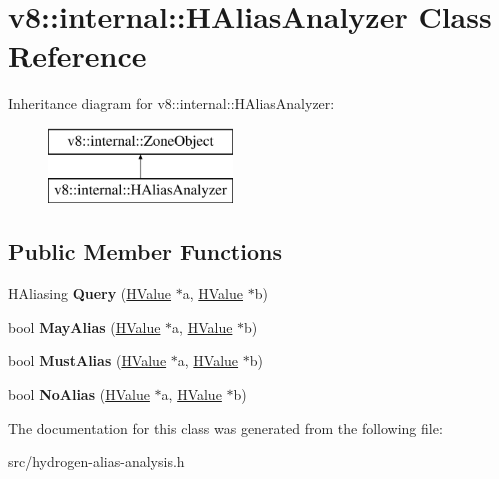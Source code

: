 \hypertarget{classv8_1_1internal_1_1_h_alias_analyzer}{}\section{v8\+:\+:internal\+:\+:H\+Alias\+Analyzer Class Reference}
\label{classv8_1_1internal_1_1_h_alias_analyzer}
Inheritance diagram for v8\+:\+:internal\+:\+:H\+Alias\+Analyzer\+:\begin{figure}[H]
\begin{center}
\leavevmode
\includegraphics[height=2.000000cm]{classv8_1_1internal_1_1_h_alias_analyzer}
\end{center}
\end{figure}
\subsection*{Public Member Functions}
\begin{DoxyCompactItemize}
\item 
\hypertarget{classv8_1_1internal_1_1_h_alias_analyzer_ad2d71024e2af0a08aaddf1a1dffd7bd0}{}H\+Aliasing {\bfseries Query} (\hyperlink{classv8_1_1internal_1_1_h_value}{H\+Value} $\ast$a, \hyperlink{classv8_1_1internal_1_1_h_value}{H\+Value} $\ast$b)\label{classv8_1_1internal_1_1_h_alias_analyzer_ad2d71024e2af0a08aaddf1a1dffd7bd0}

\item 
\hypertarget{classv8_1_1internal_1_1_h_alias_analyzer_abf51f74e8e1f0b8c9b2f0c52599c6ef8}{}bool {\bfseries May\+Alias} (\hyperlink{classv8_1_1internal_1_1_h_value}{H\+Value} $\ast$a, \hyperlink{classv8_1_1internal_1_1_h_value}{H\+Value} $\ast$b)\label{classv8_1_1internal_1_1_h_alias_analyzer_abf51f74e8e1f0b8c9b2f0c52599c6ef8}

\item 
\hypertarget{classv8_1_1internal_1_1_h_alias_analyzer_a3dd5a9de48296707c55649b4e5321e90}{}bool {\bfseries Must\+Alias} (\hyperlink{classv8_1_1internal_1_1_h_value}{H\+Value} $\ast$a, \hyperlink{classv8_1_1internal_1_1_h_value}{H\+Value} $\ast$b)\label{classv8_1_1internal_1_1_h_alias_analyzer_a3dd5a9de48296707c55649b4e5321e90}

\item 
\hypertarget{classv8_1_1internal_1_1_h_alias_analyzer_afbf1c6f713353d71032a10cd47a7529f}{}bool {\bfseries No\+Alias} (\hyperlink{classv8_1_1internal_1_1_h_value}{H\+Value} $\ast$a, \hyperlink{classv8_1_1internal_1_1_h_value}{H\+Value} $\ast$b)\label{classv8_1_1internal_1_1_h_alias_analyzer_afbf1c6f713353d71032a10cd47a7529f}

\end{DoxyCompactItemize}


The documentation for this class was generated from the following file\+:\begin{DoxyCompactItemize}
\item 
src/hydrogen-\/alias-\/analysis.\+h\end{DoxyCompactItemize}
